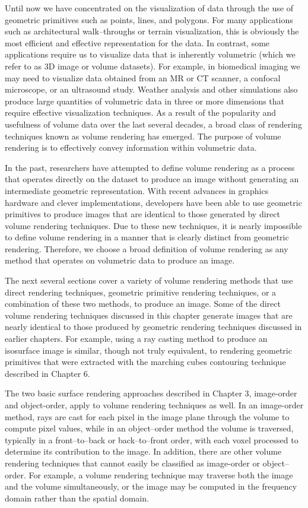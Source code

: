 Until now we have concentrated on the visualization of data through the use of geometric primitives such as points, lines, and polygons.
For many applications such as architectural walk--throughs or terrain visualization, this is obviously the most efficient and effective representation for the data.
In contrast, some applications require us to visualize data that is inherently volumetric (which we refer to as 3D image or volume datasets).
For example, in biomedical imaging we may need to visualize data obtained from an MR or CT scanner, a confocal microscope, or an ultrasound study.
Weather analysis and other simulations also produce large quantities of volumetric data in three or more dimensions that require effective visualization techniques.
As a result of the popularity and usefulness of volume data over the last several decades, a broad class of rendering techniques known as volume rendering has emerged. The purpose of volume rendering is to effectively convey information within volumetric data.

In the past, researchers have attempted to define volume rendering as a process that operates directly on the dataset to produce an image without generating an intermediate geometric representation. With recent advances in graphics hardware and clever implementations, developers have been able to use geometric primitives to produce images that are identical to those generated by direct volume rendering techniques. Due to these new techniques, it is nearly impossible to define volume rendering in a manner that is clearly distinct from geometric rendering. Therefore, we choose a broad definition of volume rendering as any method that operates on volumetric data to produce an image.

The next several sections cover a variety of volume rendering methods that use direct rendering techniques, geometric primitive rendering techniques, or a combination of these two methods, to produce an image. Some of the direct volume rendering techniques discussed in this chapter generate images that are nearly identical to those produced by geometric rendering techniques discussed in earlier chapters. For example, using a ray casting method to produce an isosurface image is similar, though not truly equivalent, to rendering geometric primitives that were extracted with the marching cubes contouring technique described in Chapter 6.

The two basic surface rendering approaches described in Chapter 3, image-order and object-order, apply to volume rendering techniques as well. In an image-order method, rays are cast for each pixel in the image plane through the volume to compute pixel values, while in an object--order method the volume is traversed, typically in a front--to--back or back--to--front order, with each voxel processed to determine its contribution to the image. In addition, there are other volume rendering techniques that cannot easily be classified as image-order or object--order. For example, a volume rendering technique may traverse both the image and the volume simultaneously, or the image may be computed in the frequency domain rather than the spatial domain.

